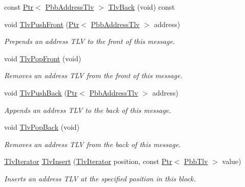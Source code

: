 \begin{DoxyCompactItemize}
const \hyperlink{classns3_1_1Ptr}{Ptr}$<$ \hyperlink{classns3_1_1PbbAddressTlv}{Pbb\+Address\+Tlv} $>$ \hyperlink{classns3_1_1PbbAddressBlock_ad02caa65e5a500dd115584c3f2f11a93}{Tlv\+Back} (void) const 
\item 
void \hyperlink{classns3_1_1PbbAddressBlock_ab7fa36bd55a355aa8354a5fb4f5204ab}{Tlv\+Push\+Front} (\hyperlink{classns3_1_1Ptr}{Ptr}$<$ \hyperlink{classns3_1_1PbbAddressTlv}{Pbb\+Address\+Tlv} $>$ address)
\begin{DoxyCompactList}\small\item\em Prepends an address T\+LV to the front of this message. \end{DoxyCompactList}\item 
void \hyperlink{classns3_1_1PbbAddressBlock_af44c51b014cf4848906d12e3110d3209}{Tlv\+Pop\+Front} (void)
\begin{DoxyCompactList}\small\item\em Removes an address T\+LV from the front of this message. \end{DoxyCompactList}\item 
void \hyperlink{classns3_1_1PbbAddressBlock_a6e33cd1452dd3ff753de3e3c99e473a5}{Tlv\+Push\+Back} (\hyperlink{classns3_1_1Ptr}{Ptr}$<$ \hyperlink{classns3_1_1PbbAddressTlv}{Pbb\+Address\+Tlv} $>$ address)
\begin{DoxyCompactList}\small\item\em Appends an address T\+LV to the back of this message. \end{DoxyCompactList}\item 
void \hyperlink{classns3_1_1PbbAddressBlock_add730bd7b11ead1f93233fcf3943a301}{Tlv\+Pop\+Back} (void)
\begin{DoxyCompactList}\small\item\em Removes an address T\+LV from the back of this message. \end{DoxyCompactList}\item 
\hyperlink{classns3_1_1PbbAddressBlock_a3bd1d32d5fa278168a97ded673ba0fd3}{Tlv\+Iterator} \hyperlink{classns3_1_1PbbAddressBlock_a19688f8fd462d3d3484bb301dbbf093d}{Tlv\+Insert} (\hyperlink{classns3_1_1PbbAddressBlock_a3bd1d32d5fa278168a97ded673ba0fd3}{Tlv\+Iterator} position, const \hyperlink{classns3_1_1Ptr}{Ptr}$<$ \hyperlink{classns3_1_1PbbTlv}{Pbb\+Tlv} $>$ value)
\begin{DoxyCompactList}\small\item\em Inserts an address T\+LV at the specified position in this block. \end{DoxyCompactList}\item 

\end{DoxyCompactItemize}
